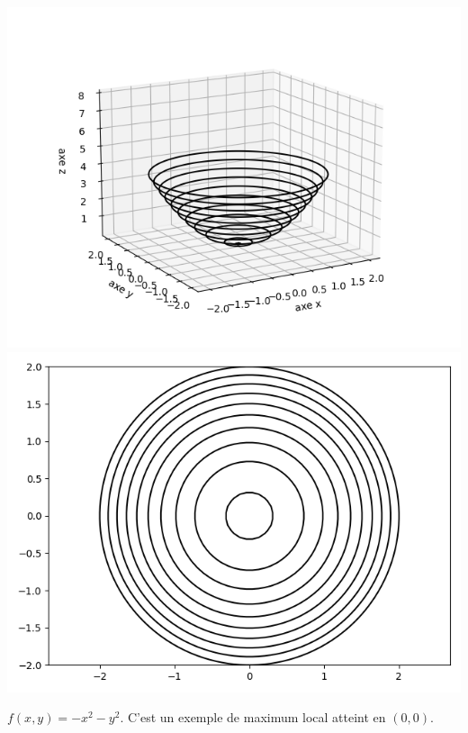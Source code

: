 \begin{center}
\includegraphics[scale=\myscale,scale=0.5]{figures/fonctions-extrem-1d}
\includegraphics[scale=\myscale,scale=0.5]{figures/fonctions-extrem-1e}
\end{center}



	

$f(x,y) = -x^2 - y^2$. C'est un exemple de maximum local atteint en $(0,0)$.


